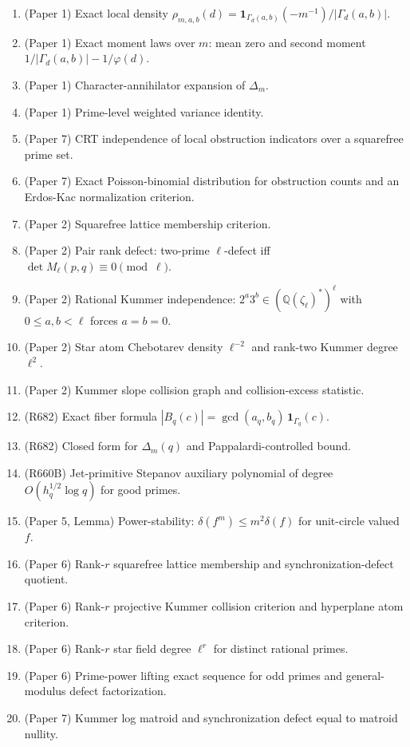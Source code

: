 \documentclass[11pt]{article}
\newcommand{\Q}{\mathbb Q}
\newcommand{\1}{\mathbf 1}
\begin{document}
\begin{enumerate}[leftmargin=2em]
\item (Paper 1) Exact local density \(\rho_{m,a,b}(d)=\1_{\Gamma_d(a,b)}(-m^{-1})/|\Gamma_d(a,b)|\).
\item (Paper 1) Exact moment laws over \(m\): mean zero and second moment \(1/|\Gamma_d(a,b)|-1/\varphi(d)\).
\item (Paper 1) Character-annihilator expansion of \(\Delta_m\).
\item (Paper 1) Prime-level weighted variance identity.
\item (Paper 7) CRT independence of local obstruction indicators over a squarefree prime set.
\item (Paper 7) Exact Poisson-binomial distribution for obstruction counts and an Erdos-Kac normalization criterion.
\item (Paper 2) Squarefree lattice membership criterion.
\item (Paper 2) Pair rank defect: two-prime \(\ell\)-defect iff \(\det M_\ell(p,q)\equiv0\pmod\ell\).
\item (Paper 2) Rational Kummer independence: \(2^a3^b\in(\Q(\zeta_\ell)^*)^\ell\) with \(0\le a,b<\ell\) forces \(a=b=0\).
\item (Paper 2) Star atom Chebotarev density \(\ell^{-2}\) and rank-two Kummer degree \(\ell^2\).
\item (Paper 2) Kummer slope collision graph and collision-excess statistic.
\item (R682) Exact fiber formula \(|B_q(c)|=\gcd(a_q,b_q)\,\1_{\Gamma_q}(c)\).
\item (R682) Closed form for \(\Delta_m(q)\) and Pappalardi-controlled bound.
\item (R660B) Jet-primitive Stepanov auxiliary polynomial of degree \(O(h_q^{1/2}\log q)\) for good primes.
\item (Paper 5, Lemma) Power-stability: \(\delta(f^m)\le m^2\delta(f)\) for unit-circle valued \(f\).
\item (Paper 6) Rank-\(r\) squarefree lattice membership and synchronization-defect quotient.
\item (Paper 6) Rank-\(r\) projective Kummer collision criterion and hyperplane atom criterion.
\item (Paper 6) Rank-\(r\) star field degree \(\ell^r\) for distinct rational primes.
\item (Paper 6) Prime-power lifting exact sequence for odd primes and general-modulus defect factorization.
\item (Paper 7) Kummer log matroid and synchronization defect equal to matroid nullity.

\end{enumerate}
\end{document}
